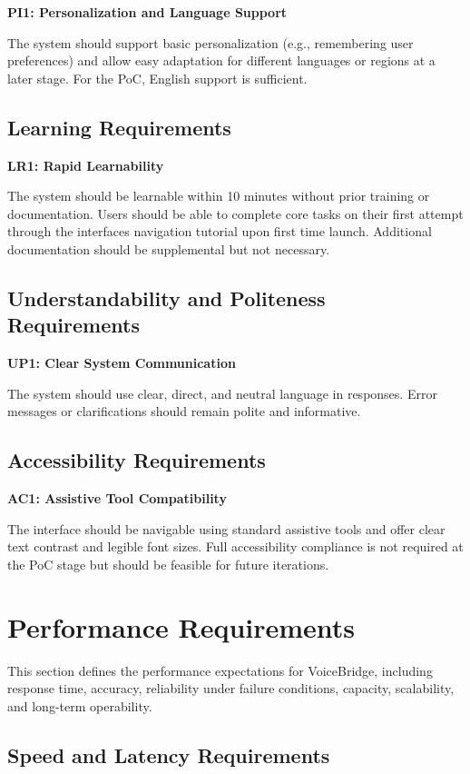 \documentclass[11pt]{article}
\begin{document}
\textbf{PI1: Personalization and Language Support}\label{req:PI1}

The system should support basic personalization (e.g., remembering user preferences) and allow easy adaptation for different languages or regions at a later stage. For the PoC, English support is sufficient.
\subsection{Learning Requirements}\label{subsec:learning}

\textbf{LR1: Rapid Learnability}\label{req:LR1}

The system should be learnable within 10 minutes without prior training or documentation. Users should be able to complete core tasks on their first attempt through the interfaces navigation tutorial upon first time launch. Additional documentation should be supplemental but not necessary. 
\subsection{Understandability and Politeness Requirements}\label{subsec:understandability}

\textbf{UP1: Clear System Communication}\label{req:UP1}

The system should use clear, direct, and neutral language in responses. Error messages or clarifications should remain polite and informative.
\subsection{Accessibility Requirements}\label{subsec:accessibility}

\textbf{AC1: Assistive Tool Compatibility}\label{req:AC1}

The interface should be navigable using standard assistive tools and offer clear text contrast and legible font sizes. Full accessibility compliance is not required at the PoC stage but should be feasible for future iterations.

\section{Performance Requirements}\label{sec:performance}
This section defines the performance expectations for VoiceBridge, including response time, accuracy, reliability under failure conditions, capacity, scalability, and long-term operability.

\subsection{Speed and Latency Requirements}\label{subsec:speed-latency}
\end{document}
